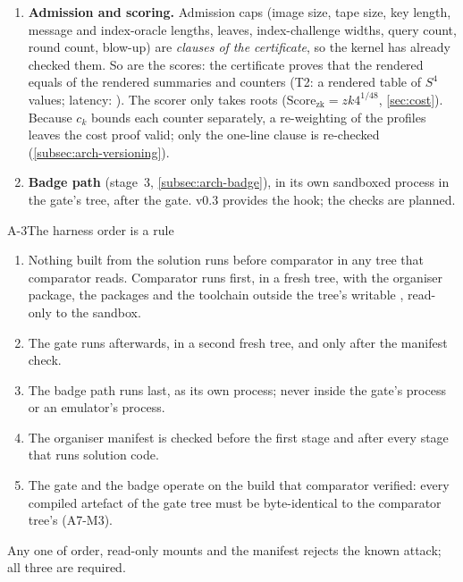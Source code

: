 \begin{enumerate}[leftmargin=1.5em,itemsep=2pt]
  the location and import-graph rule that replaced it trusted files the solution build could rewrite
  (A6-G2). On the toy certificate the gate classifies 3,630 modules (3,597 trusted, 29 pinned by hash)
  in 12.6\,s. Separately,  checks every one of the 1,501 declarations of
  the 31 organiser modules (contract, library, controls, bridge) against the three axioms, so that no
  organiser lemma a submission imports smuggles in  or native evaluation.
\item \textbf{Admission and scoring.} Admission caps (image size, tape size, key length, message and
  index-oracle lengths, leaves, index-challenge widths, query count, round count, blow-up) are
  \emph{clauses of the certificate}, so the kernel has already checked them. So are the scores:
  the certificate proves that the rendered  equals  of the rendered
  summaries and counters (T2: a rendered table of $S^4$ values; latency: ). The
  scorer only takes roots ($\mathrm{Score}_{\mathrm{zk}}=\mathit{zk4}^{1/48}$,
  \cref{sec:cost}). Because $c_k$ bounds each counter separately, a re-weighting of the profiles
  leaves the cost proof valid; only the one-line  clause is re-checked
  (\cref{subsec:arch-versioning}).
\item \textbf{Badge path} (stage~3, \cref{subsec:arch-badge}), in its own sandboxed process in the
  gate's tree, after the gate. v0.3 provides the hook; the checks are planned.
\end{enumerate}

\begin{decision}{A-3}{The harness order is a rule}
\begin{enumerate}[nosep,leftmargin=1.3em]
\item Nothing built from the solution runs before comparator in any tree that comparator reads.
  Comparator runs first, in a fresh tree, with the organiser package, the packages and the toolchain
  outside the tree's writable , read-only to the sandbox.
\item The gate runs afterwards, in a second fresh tree, and only after the manifest check.
\item The badge path runs last, as its own process; never inside the gate's process or an
  emulator's process.
\item The organiser  manifest is checked before the first stage and after every stage
  that runs solution code.
\item The gate and the badge operate on the build that comparator verified: every compiled
  artefact of the gate tree must be byte-identical to the comparator tree's (A7-M3).
\end{enumerate}
Any one of order, read-only mounts and the manifest rejects the known attack; all three are
required.
\end{decision}


